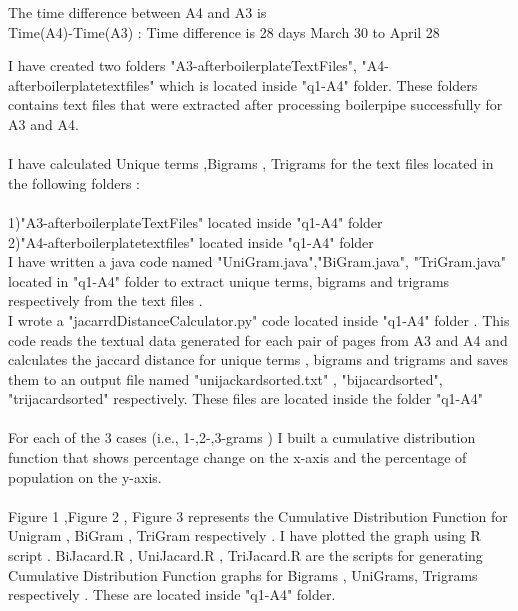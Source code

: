 \documentclass[12pt]{Report}
\begin{document}
The time difference between A4 and A3 is \\

Time(A4)-Time(A3) : Time difference is 28 days March 30 to April 28


I have created two folders "A3-afterboilerplateTextFiles", "A4-afterboilerplatetextfiles" which is located inside "q1-A4" folder. These folders contains text files that were extracted after processing boilerpipe successfully for A3 and A4.\\\\

I have calculated Unique terms ,Bigrams , Trigrams for the text files located in the following folders :\\ \\
1)"A3-afterboilerplateTextFiles"  located inside "q1-A4" folder  \\
2)"A4-afterboilerplatetextfiles" located inside "q1-A4" folder \\

I have written a java code named "UniGram.java","BiGram.java", "TriGram.java"  located in "q1-A4" folder to extract unique terms, bigrams and trigrams respectively from  the text files . \\

I wrote a "jacarrdDistanceCalculator.py" code located inside "q1-A4" folder . This code reads the textual data generated for each pair of pages from A3 and A4 and calculates the jaccard distance for unique terms , bigrams and trigrams and saves them to an output file named "unijackardsorted.txt" , "bijacardsorted", "trijacardsorted" respectively. These files are located inside the folder "q1-A4" \\ \\

For each of the 3 cases (i.e., 1-,2-,3-grams ) I built a cumulative distribution function that shows percentage change on the x-axis and the percentage of population on the y-axis. \\ \\

Figure 1 ,Figure 2 , Figure 3 represents the Cumulative Distribution Function for Unigram , BiGram , TriGram respectively .  I have plotted the graph using R script . BiJacard.R , UniJacard.R , TriJacard.R are the scripts for generating Cumulative Distribution Function  graphs for Bigrams , UniGrams, Trigrams respectively . These are located inside "q1-A4" folder.\\
\end{document}
